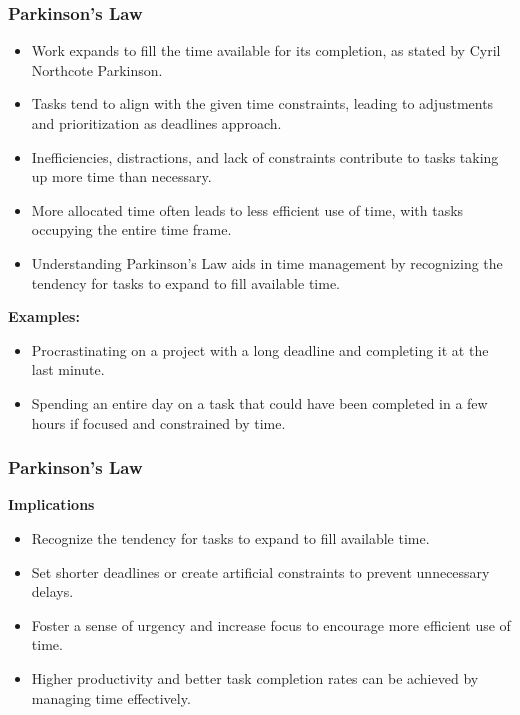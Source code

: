 \begin{frame}[fragile]\frametitle{Parkinson's Law}
\begin{itemize}
    \item Work expands to fill the time available for its completion, as stated by Cyril Northcote Parkinson.
    \item Tasks tend to align with the given time constraints, leading to adjustments and prioritization as deadlines approach.
    \item Inefficiencies, distractions, and lack of constraints contribute to tasks taking up more time than necessary.
    \item More allocated time often leads to less efficient use of time, with tasks occupying the entire time frame.
    \item Understanding Parkinson's Law aids in time management by recognizing the tendency for tasks to expand to fill available time.
\end{itemize}
\textbf{Examples:}
\begin{itemize}
    \item Procrastinating on a project with a long deadline and completing it at the last minute.
    \item Spending an entire day on a task that could have been completed in a few hours if focused and constrained by time.
\end{itemize}
\end{frame}

\begin{frame}[fragile]\frametitle{Parkinson's Law}
\textbf{Implications}
\begin{itemize}
    \item Recognize the tendency for tasks to expand to fill available time.
    \item Set shorter deadlines or create artificial constraints to prevent unnecessary delays.
    \item Foster a sense of urgency and increase focus to encourage more efficient use of time.
    \item Higher productivity and better task completion rates can be achieved by managing time effectively.
\end{itemize}
\end{frame}

